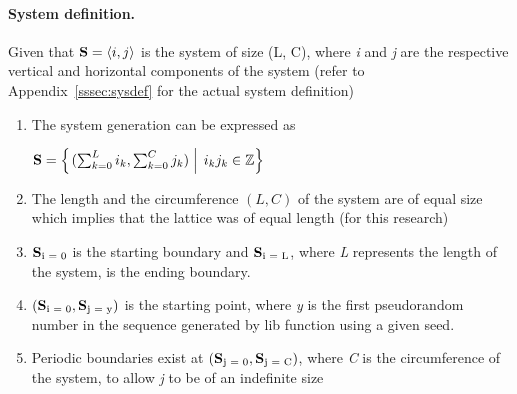 \documentclass{article}
\DeclarePairedDelimiter{\opair}{\langle}{\rangle}
\begin{document}
\paragraph{System definition.}\label{subsec:sysfdef} Given that $\vb{S}=\opair{i, j}$ is the system of size (L, C), where \emph{i} and \emph{j} are the respective vertical and horizontal components of the system (refer to Appendix~\ref{sssec:sysdef} for the actual system definition)
	\begin{enumerate}
		\item The system generation can be expressed as
			\begin{center}
				$\vb{S} = \left\{\left. (\sum_{k=0}^L i_k,  \sum_{k=0}^C j_k) \; \right\vert \;i_k j_k \in\mathbb{Z} \right\}$
			\end{center}
		\item The length and the circumference $(L, C)$ of the system are of equal size which implies that the lattice was of equal length (for this research)
		\item $\vb{S}\textsubscript{i = 0}$ is the starting boundary and $\vb{S}\textsubscript{i = L}$, where \emph{L}  represents the length of the system, is the ending boundary. 
		\item $(\vb{S}\textsubscript{i = 0}, \vb{S}\textsubscript{j = y})$  is the starting point, where \emph{y} is the first pseudorandom number in the sequence generated by lib function using a given seed.
		\item Periodic boundaries exist at $(\vb{S}\textsubscript{j = 0}, \vb{S}\textsubscript{j = C})$, where \emph{C} is the circumference of the system, to allow \emph{j} to be of an indefinite size
	\end{enumerate}
\end{document}
